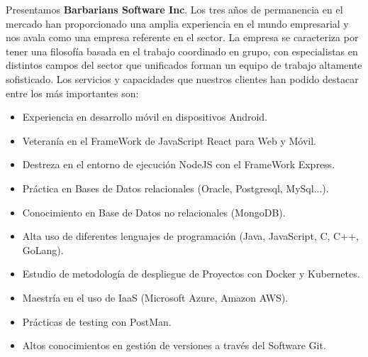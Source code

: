 Presentamos \textbf{Barbarians Software Inc}. Los tres años de permanencia en el mercado han proporcionado una amplia experiencia en el mundo empresarial y nos avala como una empresa referente en el sector. La empresa se caracteriza por tener una filosofía basada en el trabajo coordinado en grupo, con especialistas en distintos campos del sector que unificados forman un equipo de trabajo altamente sofisticado.
Los servicios y capacidades que nuestros clientes han podido destacar entre los más importantes son:
\begin{itemize}
   \item Experiencia en desarrollo móvil en dispositivos Android.
   \item Veteranía en el FrameWork de JavaScript React para Web y Móvil.
   \item Destreza en el entorno de ejecución NodeJS con el FrameWork Express.
   \item Práctica en Bases de Datos relacionales (Oracle, Postgresql, MySql...).
   \item Conocimiento en Base de Datos no relacionales (MongoDB).
   \item Alta uso de diferentes lenguajes de programación (Java, JavaScript, C, C++, GoLang).
   \item Estudio de metodología de despliegue de Proyectos con Docker y Kubernetes.
   \item Maestría en el uso de IaaS (Microsoft Azure, Amazon AWS).
   \item Prácticas de testing con PostMan.
   \item Altos conocimientos en gestión de versiones a través del Software Git.
\end{itemize}